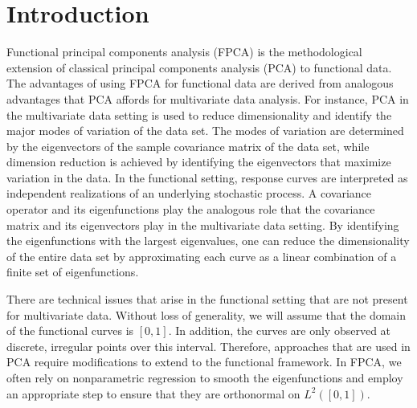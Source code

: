 \documentclass[ba]{imsart}
\numberwithin{equation}{section}
\theoremstyle{plain}
\begin{document}
\begin{frontmatter}
\begin{keyword}[class=MSC]
\end{keyword}

\begin{keyword}
\end{keyword}

\end{frontmatter}


\section{Introduction}
\label{sec:intro}

Functional principal components analysis (FPCA) is the methodological extension of classical principal
components analysis (PCA) to functional data. The advantages of using FPCA for functional data are derived
from analogous advantages that PCA affords for multivariate data analysis. For instance, PCA in the multivariate
data setting is used to reduce dimensionality and identify the major modes of variation of the
data set. The modes of variation are determined by the eigenvectors of the sample covariance matrix of the data
set, while dimension reduction is achieved by identifying the eigenvectors that maximize variation in the data.
In the functional setting, response curves are interpreted as independent realizations of an underlying
stochastic process. A covariance operator and its eigenfunctions play the analogous
role that the covariance matrix and its eigenvectors play in the multivariate data setting. By identifying the
eigenfunctions with the largest eigenvalues, one can reduce the
dimensionality of the entire data set by approximating each curve as a linear combination of a finite set
of eigenfunctions.

There are technical issues that arise in the functional setting that are not present for multivariate data.
Without loss of generality, we will assume that
the domain of the functional curves is $[0, 1]$.
In addition, the curves are only observed at discrete, irregular points over this interval.
Therefore, approaches that are used in PCA require
modifications to extend to the functional framework.
In FPCA, we often rely on nonparametric regression to smooth the eigenfunctions and employ
an appropriate step to ensure that they are orthonormal on $L^2 ([0, 1])$.
\end{document}
